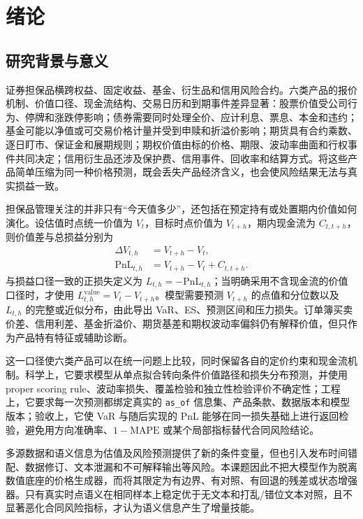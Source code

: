 \chapter{绪论}

\section{研究背景与意义}

证券担保品横跨权益、固定收益、基金、衍生品和信用风险合约。六类产品的报价机制、价值口径、现金流结构、交易日历和到期事件差异显著：股票价值受公司行为、停牌和涨跌停影响；债券需要同时处理全价、应计利息、票息、本金和违约；基金可能以净值或可交易价格计量并受到申赎和折溢价影响；期货具有合约乘数、逐日盯市、保证金和展期规则；期权价值由标的价格、期限、波动率曲面和行权事件共同决定；信用衍生品还涉及保护费、信用事件、回收率和结算方式。将这些产品简单压缩为同一种价格预测，既会丢失产品经济含义，也会使风险结果无法与真实损益一致。

担保品管理关注的并非只有“今天值多少”，还包括在预定持有或处置期内价值如何演化。设估值时点统一价值为 \(V_t\)，目标时点价值为 \(V_{t+h}\)，期内现金流为 \(C_{t,t+h}\)，则价值差与总损益分别为
\begin{align}
  \Delta V_{t,h} &= V_{t+h}-V_t,\\
  \mathrm{PnL}_{t,h} &= V_{t+h}-V_t+C_{t,t+h}.
\end{align}
与损益口径一致的正损失定义为 \(L_{t,h}=-\mathrm{PnL}_{t,h}\)；当明确采用不含现金流的价值口径时，才使用 \(L^{\mathrm{value}}_{t,h}=V_t-V_{t+h}\)。模型需要预测 \(V_{t+h}\) 的点值和分位数以及 \(L_{t,h}\) 的完整或近似分布，由此导出 VaR、ES、预测区间和压力损失。订单簿买卖价差、信用利差、基金折溢价、期货基差和期权波动率偏斜仍有解释价值，但只作为产品特有特征或辅助诊断。

这一口径使六类产品可以在统一问题上比较，同时保留各自的定价约束和现金流机制。科学上，它要求模型从单点拟合转向条件价值路径和损失分布预测，并使用 proper scoring rule、波动率损失、覆盖检验和独立性检验评价不确定性；工程上，它要求每一次预测都绑定真实的 \texttt{as\_of} 信息集、产品条款、数据版本和模型版本；验收上，它使 VaR 与随后实现的 PnL 能够在同一损失基础上进行返回检验，避免用方向准确率、\(1-\mathrm{MAPE}\) 或某个局部指标替代合同风险结论。

多源数据和语义信息为估值及风险预测提供了新的条件变量，但也引入发布时间错配、数据修订、文本泄漏和不可解释输出等风险。本课题因此不把大模型作为脱离数值底座的价格生成器，而将其限定为有边界、有对照、有回退的残差或状态增强器。只有真实时点语义在相同样本上稳定优于无文本和打乱/错位文本对照，且不显著恶化合同风险指标，才认为语义信息产生了增量技能。

